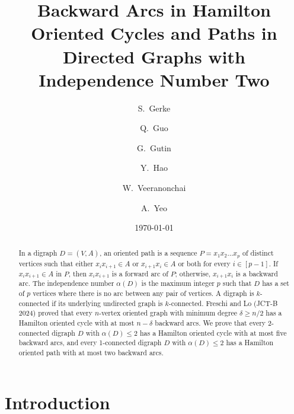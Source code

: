\documentclass{article}
\newcommand{\2}{\vspace{2mm}}
\theoremstyle{definition}
\begin{document}



\title{Backward Arcs in Hamilton Oriented  Cycles and Paths in Directed Graphs with  Independence Number Two}
\author[1]{S.~Gerke}
\author[2]{Q.~Guo}
\author[2,3]{G.~Gutin}
\author[3]{Y.~Hao}
\author[1]{W.~Veeranonchai}
\author[4,5]{A.~Yeo}


\date{\today}
\maketitle

\begin{abstract}
In a digraph $D=(V,A)$, an oriented path is a sequence $P=x_1x_2\dots x_p$ of distinct vertices such that either $x_ix_{i+1}\in A$ or $x_{i+1}x_{i}\in A$ or both for every $i\in [p-1]$. If $x_ix_{i+1}\in A$ in $P$, then $x_ix_{i+1}$ is a forward arc of $P$;
otherwise, $x_{i+1}x_{i}$ is a backward arc. The independence number $\alpha(D)$ is the maximum integer $p$ such that $D$ has a set of $p$ vertices where there is no arc between any pair of vertices. 
A digraph is $k$-connected if its underlying undirected graph is $k$-connected. 
Freschi and Lo (JCT-B 2024) proved that every $n$-vertex oriented graph with minimum degree $\delta\ge n/2$ has a Hamilton oriented cycle with at most $n-\delta$ backward arcs. We prove that 
every 2-connected digraph $D$ with $\alpha(D)\le 2$ has a Hamilton oriented cycle with at most five backward arcs, and  every 1-connected digraph $D$ with $\alpha(D)\le 2$ has a Hamilton oriented path with at most two backward arcs.
\end{abstract}

\section{Introduction}\label{sec:intro}

\end{document}
